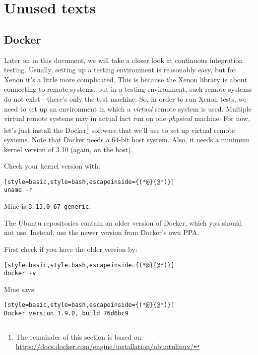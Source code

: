 \chapter{Unused texts}





\section{Docker}

Later on in this document, we will take a closer look at continuous integration testing. Usually, setting up a testing environment is reasonably easy, but for Xenon it's a little more complicated. This is because the Xenon library is about connecting to remote systems, but in a testing environment, such remote systems do not exist---there's only the test machine. So, in order to run Xenon tests, we need to set up an environment in which a \textit{virtual} remote system is used. Multiple virtual remote systems may in actual fact run on one \textit{physical} machine. For now, let's just install the Docker\footnote{The remainder of this section is based on: \url{https://docs.docker.com/engine/installation/ubuntulinux/}} software that we'll use to set up virtual remote systems. Note that Docker needs a 64-bit host system. Also, it needs a minimum kernel version of 3.10 (again, on the host).

Check your kernel version with:
\begin{lstlisting}[style=basic,style=bash,escapeinside={(*@}{@*)}]
uname -r
\end{lstlisting}
Mine is \texttt{3.13.0-67-generic}.

The Ubuntu repositories contain an older version of Docker, which you should not use. Instead, use the newer version from Docker's own PPA.

First check if you have the older version by:
\begin{lstlisting}[style=basic,style=bash,escapeinside={(*@}{@*)}]
docker -v
\end{lstlisting}
Mine says:
\begin{lstlisting}[style=basic,style=bash,escapeinside={(*@}{@*)}]
Docker version 1.9.0, build 76d6bc9
\end{lstlisting}


